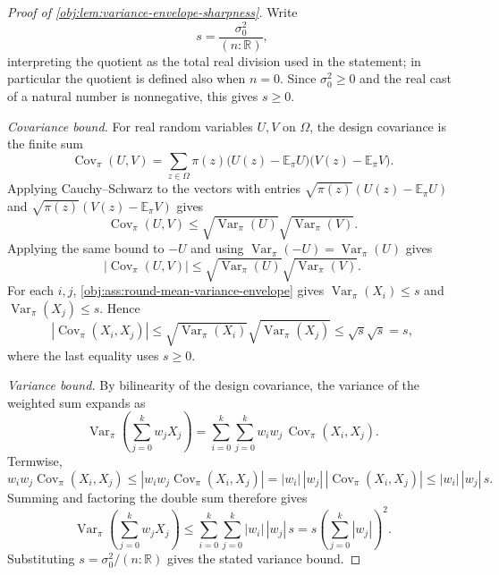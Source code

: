 \begin{proof}[Proof of \cref{obj:lem:variance-envelope-sharpness}]
Write
\[
s=\frac{\sigma_0^2}{(n:\mathbb R)},
\]
interpreting the quotient as the total real division used in the statement; in particular the quotient is defined also when \(n=0\). Since \(\sigma_0^2\ge0\) and the real cast of a natural number is nonnegative, this gives \(s\ge0\).

\emph{Covariance bound.}
For real random variables \(U,V\) on \(\Omega\), the design covariance is the finite sum
\[
\operatorname{Cov}_\pi(U,V)
=
\sum_{z\in\Omega}\pi(z)\bigl(U(z)-\mathbb E_\pi U\bigr)\bigl(V(z)-\mathbb E_\pi V\bigr).
\]
Applying Cauchy--Schwarz to the vectors with entries \(\sqrt{\pi(z)}(U(z)-\mathbb E_\pi U)\) and \(\sqrt{\pi(z)}(V(z)-\mathbb E_\pi V)\) gives
\[
\operatorname{Cov}_\pi(U,V)
\le
\sqrt{\operatorname{Var}_\pi(U)}
\sqrt{\operatorname{Var}_\pi(V)}.
\]
Applying the same bound to \(-U\) and using \(\operatorname{Var}_\pi(-U)=\operatorname{Var}_\pi(U)\) gives
\[
|\operatorname{Cov}_\pi(U,V)|
\le
\sqrt{\operatorname{Var}_\pi(U)}
\sqrt{\operatorname{Var}_\pi(V)}.
\] %
For each \(i,j\), \cref{obj:ass:round-mean-variance-envelope} gives
\(\operatorname{Var}_\pi(X_i)\le s\) and \(\operatorname{Var}_\pi(X_j)\le s\). Hence
\[
|\operatorname{Cov}_\pi(X_i,X_j)|
\le
\sqrt{\operatorname{Var}_\pi(X_i)}\sqrt{\operatorname{Var}_\pi(X_j)}
\le
\sqrt{s}\sqrt{s}
=
s,
\]
where the last equality uses \(s\ge0\). %

\emph{Variance bound.}
By bilinearity of the design covariance, the variance of the weighted sum expands as
\[
\operatorname{Var}_\pi\!\left(\sum_{j=0}^k w_jX_j\right)
=
\sum_{i=0}^k\sum_{j=0}^k
w_iw_j\,\operatorname{Cov}_\pi(X_i,X_j).
\]
Termwise,
\[
w_iw_j\operatorname{Cov}_\pi(X_i,X_j)
\le |w_iw_j\operatorname{Cov}_\pi(X_i,X_j)|
= |w_i|\,|w_j|\,|\operatorname{Cov}_\pi(X_i,X_j)|
\le |w_i|\,|w_j|\,s.
\]
Summing and factoring the double sum therefore gives
\[
\operatorname{Var}_\pi\!\left(\sum_{j=0}^k w_jX_j\right)
\le
\sum_{i=0}^k\sum_{j=0}^k |w_i|\,|w_j|\,s
=
s\left(\sum_{j=0}^k |w_j|\right)^2.
\] %
Substituting \(s=\sigma_0^2/(n:\mathbb R)\) gives the stated variance bound.


\end{proof}
